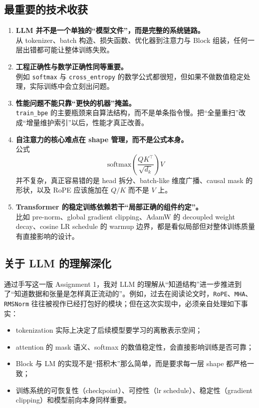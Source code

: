 \documentclass[UTF8,a4paper,11pt]{ctexart}
\begin{document}
\subsection{最重要的技术收获}
\begin{enumerate}[leftmargin=2em]
  \item \textbf{LLM 并不是一个单独的“模型文件”，而是完整的系统链路。} \\
  从 tokenizer、batch 构造、损失函数、优化器到注意力与 Block 组装，任何一层出错都可能让整体训练失败。

  \item \textbf{工程正确性与数学正确性同等重要。} \\
  例如 \texttt{softmax} 与 \texttt{cross\_entropy} 的数学公式都很短，但如果不做数值稳定处理，实际训练中会立刻出问题。

  \item \textbf{性能问题不能只靠“更快的机器”掩盖。} \\
  \texttt{train\_bpe} 的主要瓶颈来自算法结构，而不是单条指令慢。把“全量重扫”改成“增量维护索引”以后，性能才真正改善。

  \item \textbf{自注意力的核心难点在 shape 管理，而不是公式本身。} \\
  公式
  \[
  \mathrm{softmax}\left(\frac{QK^\top}{\sqrt{d_k}}\right)V
  \]
  并不复杂，真正容易错的是 head 拆分、batch-like 维度广播、causal mask 的形状，以及 RoPE 应该施加在 \(Q/K\) 而不是 \(V\) 上。

  \item \textbf{Transformer 的稳定训练依赖若干“局部正确的组件约定”。} \\
  比如 pre-norm、global gradient clipping、AdamW 的 decoupled weight decay、cosine LR schedule 的 warmup 边界，都是看似局部但对整体训练质量有直接影响的设计。
\end{enumerate}

\subsection{关于 LLM 的理解深化}
通过手写这一版 Assignment 1，我对 LLM 的理解从“知道结构”进一步推进到了“知道数据和张量是怎样真正流动的”。例如，过去在阅读论文时，\texttt{RoPE}、\texttt{MHA}、\texttt{RMSNorm} 往往被视作已经打包好的模块；但在这次实现中，必须亲自处理如下事实：
\begin{itemize}[leftmargin=2em]
  \item tokenization 实际上决定了后续模型要学习的离散表示空间；
  \item attention 的 mask 语义、softmax 的数值稳定性，会直接影响训练是否可靠；
  \item Block 与 LM 的实现不是“搭积木”那么简单，而是要求每一层 shape 都严格一致；
  \item 训练系统的可恢复性（checkpoint）、可控性（lr schedule）、稳定性（gradient clipping）和模型前向本身同样重要。
\end{itemize}
\end{document}
